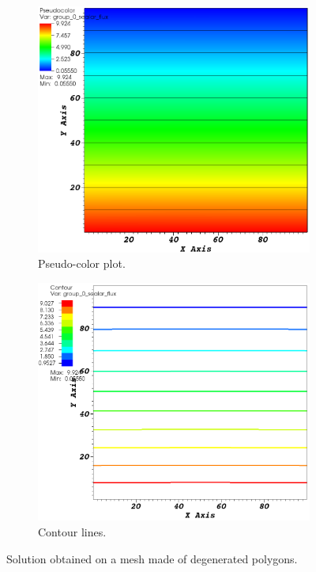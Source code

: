 \documentclass[preprint,10pt]{elsarticle}
\renewcommand{\(}{\left(}
\renewcommand{\)}{\right)}
\renewcommand{\[}{\left[}
\renewcommand{\]}{\right]}
\begin{document}
\begin{figure}[!htbp]
  \begin{subfigure}{0.45\textwidth}
    \centering
    \includegraphics[width=\textwidth]{no_dsa}
    \caption{Pseudo-color plot.}
    \label{fig_no_dsa}
  \end{subfigure}
  \begin{subfigure}{0.47\textwidth}
    \centering
    \includegraphics[width=\textwidth]{contour}
    \caption{Contour lines.}
    \label{fig_contour}
  \end{subfigure}
  \caption{Solution obtained on a mesh made of degenerated polygons.}
\end{figure}
\end{document}

